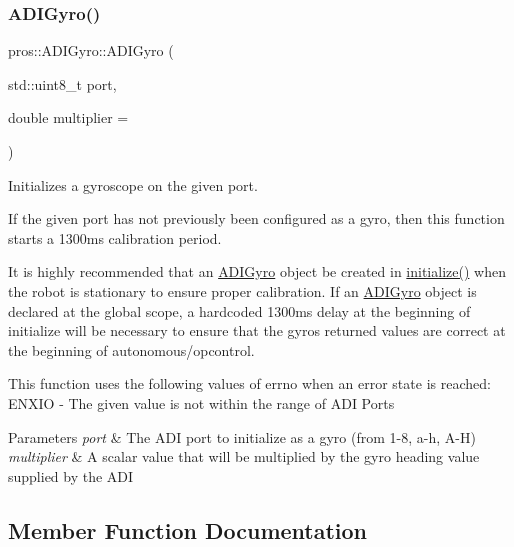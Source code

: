 \subsubsection{\texorpdfstring{A\+D\+I\+Gyro()}{ADIGyro()}}
{\footnotesize\ttfamily pros\+::\+A\+D\+I\+Gyro\+::\+A\+D\+I\+Gyro (\begin{DoxyParamCaption}\item[{std\+::uint8\+\_\+t}]{port,  }\item[{double}]{multiplier = {} }\end{DoxyParamCaption})}



Initializes a gyroscope on the given port. 

If the given port has not previously been configured as a gyro, then this function starts a 1300ms calibration period.

It is highly recommended that an \hyperlink{classpros_1_1ADIGyro}{A\+D\+I\+Gyro} object be created in \hyperlink{main_8h_a9efe22aaead3a5e936b5df459de02eba}{initialize()} when the robot is stationary to ensure proper calibration. If an \hyperlink{classpros_1_1ADIGyro}{A\+D\+I\+Gyro} object is declared at the global scope, a hardcoded 1300ms delay at the beginning of initialize will be necessary to ensure that the gyro\textquotesingle{}s returned values are correct at the beginning of autonomous/opcontrol.

This function uses the following values of errno when an error state is reached\+: E\+N\+X\+IO -\/ The given value is not within the range of A\+DI Ports


\begin{DoxyParams}{Parameters}
{\em port} & The A\+DI port to initialize as a gyro (from 1-\/8, \textquotesingle{}a\textquotesingle{}-\/\textquotesingle{}h\textquotesingle{}, \textquotesingle{}A\textquotesingle{}-\/\textquotesingle{}H\textquotesingle{}) \\
\hline
{\em multiplier} & A scalar value that will be multiplied by the gyro heading value supplied by the A\+DI \\
\hline
\end{DoxyParams}


\subsection{Member Function Documentation}
\mbox{\label{classpros_1_1ADIGyro_a829f933aaaa370483c36aba9f4a4f09c}} 
